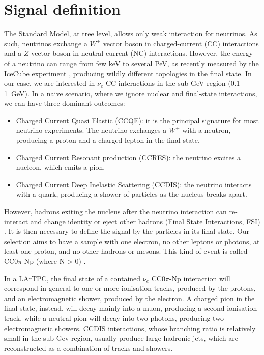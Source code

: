 \documentclass[a4paper]{article}
\begin{document}
\section{Signal definition}
The Standard Model, at tree level, allows only weak interaction for neutrinos. As such, neutrinos exchange a $W^{\pm}$ vector boson in charged-current (CC) interactions and a $Z$ vector boson in neutral-current (NC) interactions. 
However, the energy of a neutrino can range from few keV to several PeV, as recently measured by the IceCube experiment \cite{icecube}, producing wildly different topologies in the final state. 
In our case, we are interested in $\nu_{e}$ CC interactions in the sub-GeV region (0.1 - 1~GeV). In a naive scenario, where we ignore nuclear and final-state interactions, we can have three dominant outcomes:
\begin{itemize}
\item Charged Current Quasi Elastic (CCQE): it is the principal signature for most neutrino experiments. The neutrino exchanges a $W^{\pm}$ with a neutron, producing a proton and a charged lepton in the final state.
\item Charged Current Resonant production (CCRES): the neutrino excites a nucleon, which emits a pion.
\item Charged Current Deep Inelastic Scattering (CCDIS): the neutrino interacts with a quark, producing a shower of particles as the nucleus breaks apart.
\end{itemize}

However, hadrons exiting the nucleus after the neutrino interaction can re-interact and change identity or eject other hadrons (Final State Interactions, FSI) \cite{ccqe2}. It is then necessary to define the signal by the particles in its final state. Our selection aims to have a sample with one electron, no other leptons or photons, at least one proton, and no other hadrons or mesons. This kind of event is called CC0$\pi$-Np (where N > 0) \cite{teppei}.

In a LArTPC, the final state of a contained $\nu_{e}$ CC0$\pi$-Np interaction will correspond in general to one or more ionisation tracks, produced by the protons, and an electromagnetic shower, produced by the electron. A charged pion in the final state, instead, will decay mainly into a muon, producing a second ionisation track, while a neutral pion will decay into two photons, producing two electromagnetic showers. 
CCDIS interactions, whose branching ratio is relatively small in the sub-Gev region, usually produce large hadronic jets, which are reconstructed as a combination of tracks and showers. 
\end{document}
